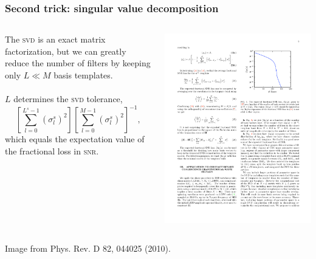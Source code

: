 \documentclass{beamer}
\begin{document}
\begin{frame}
	\frametitle{Second trick: singular value decomposition}
	\begin{columns}
		\begin{column}{0.6\textwidth}
			The \textsc{svd} is an exact matrix factorization, but we can greatly reduce the number of filters by keeping only $L \ll M$ basis templates. \\~\\

			$L$ determines the \textsc{svd} tolerance,
			$$\left[ \sum_{l=0}^{L^s-1} \left( \sigma_l^s \right)^2 \right]\left[ \sum_{l=0}^{M-1} \left( \sigma_l^s \right)^2 \right]^{-1},$$
			which equals the expectation value of the fractional loss in \textsc{snr}.
		\end{column}
		\begin{column}{0.4\textwidth}
			\includegraphics[width=\textwidth]{figures/singular-values}
		\end{column}
	\end{columns}
	\begin{flushright}
		\footnotesize{Image from Phys. Rev. D 82, 044025 (2010).}
	\end{flushright}
\end{frame}
\end{document}
